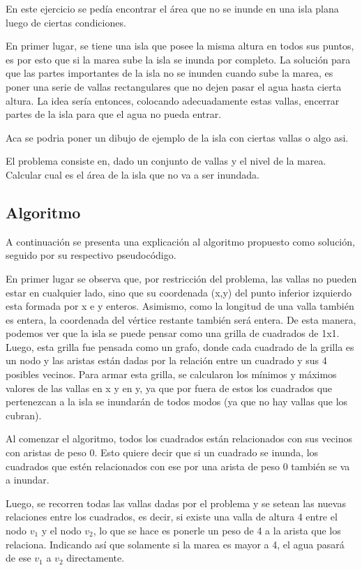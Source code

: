 \documentclass[a4paper, 12pt]{article}
\begin{document}
En este ejercicio se pedía encontrar el área que no se inunde en una isla plana luego de ciertas condiciones.

En primer lugar, se tiene una isla que posee la misma altura en todos sus puntos, es por esto que si la marea sube la isla se inunda por completo. La solución para que las partes importantes de la isla no se inunden cuando sube la marea, es poner una serie de vallas rectangulares que no dejen pasar el agua hasta cierta altura. La idea sería entonces, colocando adecuadamente estas vallas, encerrar partes de la isla para que el agua no pueda entrar.

Aca se podria poner un dibujo de ejemplo de la isla con ciertas vallas o algo asi.

El problema consiste en, dado un conjunto de vallas y el nivel de la marea. Calcular cual es el área de la isla que no va a ser inundada.

\subsection*{Algoritmo}

A continuación se presenta una explicación al algoritmo propuesto como solución, seguido por su respectivo pseudocódigo.

En primer lugar se observa que, por restricción del problema, las vallas no pueden estar en cualquier lado, sino que su coordenada (x,y) del punto inferior izquierdo esta formada por x e y enteros. Asimismo, como la longitud de una valla también es entera, la coordenada del vértice restante también será entera. De esta manera, podemos ver que la isla se puede pensar como una grilla de cuadrados de 1x1. Luego, esta grilla fue pensada como un grafo, donde cada cuadrado de la grilla es un nodo y las aristas están dadas por la relación entre un cuadrado y sus 4 posibles vecinos. Para armar esta grilla, se calcularon los mínimos y máximos valores de las vallas en x y en y, ya que por fuera de estos los cuadrados que pertenezcan a la isla se inundarán de todos modos (ya que no hay vallas que los cubran).

Al comenzar el algoritmo, todos los cuadrados están relacionados con sus vecinos con aristas de peso 0. Esto quiere decir que si un cuadrado se inunda, los cuadrados que estén relacionados con ese por una arista de peso 0 también se va a inundar. 

Luego, se recorren todas las vallas dadas por el problema y se setean las nuevas relaciones entre los cuadrados, es decir, si existe una valla de altura 4 entre el nodo $v_1$ y el nodo $v_2$, lo que se hace es ponerle un peso de 4 a la arista que los relaciona. Indicando así que solamente si la marea es mayor a 4, el agua pasará de ese $v_1$ a $v_2$ directamente.
\end{document}
